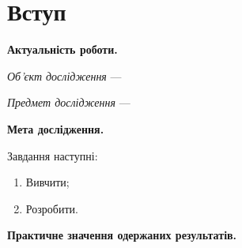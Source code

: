 \chapter*{Вступ}

\textbf{Актуальність роботи.}

\textit{Об’єкт дослідження} ---

\textit{Предмет дослідження} ---

\textbf{Мета дослідження.}

Завдання наступні:
\begin{enumerate}
  \item
    Вивчити;
  \item
    Розробити.
\end{enumerate}

\textbf{Практичне значення одержаних результатів.}
